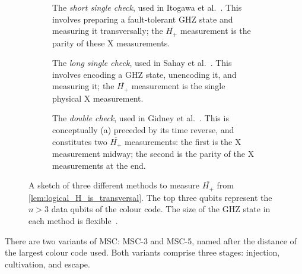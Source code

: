 \begin{figure}
	\centering
	
	\begin{subfigure}{0.25\linewidth}
		\caption{The \emph{short single check}, used in
		Itogawa et al.~\cite{Itogawa2025}.
		This involves preparing a fault-tolerant GHZ state
		and measuring it transversally;
		the $\overline{H_+}$ measurement is the
		parity of these X measurements.}
		\label{fig:short_single_check_sketch}
	\end{subfigure}
	\hfill
	\begin{subfigure}{0.24\linewidth}
		\caption{The \emph{long single check}, used in
		Sahay et al.~\cite{Sahay2026}.
		This involves encoding a GHZ state,
		unencoding it,
		and measuring it;
		the $\overline{H_+}$ measurement is the
		single physical X measurement.}
		\label{fig:long_single_check_sketch}
	\end{subfigure}
	\hfill
	\begin{subfigure}{0.45\linewidth}
		\caption{The \emph{double check}, used in
		Gidney et al.~\cite{Gidney2024}.
		This is conceptually (a) preceded by its time reverse,
		and constitutes two $\overline{H_+}$ measurements:
		the first is the X measurement midway;
		the second is the parity of the X measurements at the end.}
		\label{fig:double_check_sketch}
	\end{subfigure}
	\caption{A sketch of three different methods to measure
	$\overline{H_+}$ from \cref{lem:logical_H_is_transversal}.
	The top three qubits represent the $n >3$ data qubits of the colour code.
	The size of the GHZ state in each method is flexible~\cite[\S B.3.b]{Sahay2026}.}
	\label{fig:check_options}
\end{figure}
There are two variants of MSC:
MSC-3 and MSC-5,
named after the distance of the largest colour code used.
Both variants comprise three stages:
injection, cultivation, and escape.

